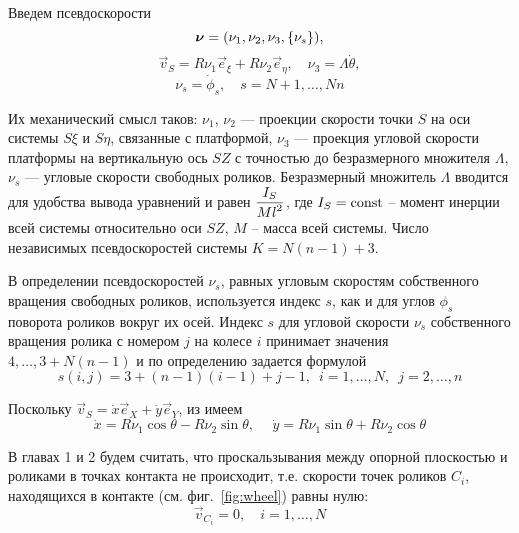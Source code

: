 Введем псевдоскорости
$$
    \boldsymbol{\mathbf{\nu}} = (\nu_1, \nu_2, \nu_3, \left\{\nu_s\right\}),
$$
\begin{equation}\label{eq:vsnu3}
    \vec{v}_S = R\nu_1\vec{e}_\xi + R\nu_2\vec{e}_\eta, \quad \nu_3 = \Lambda\dot{\theta},
\end{equation}
\begin{equation}\label{eq:nus}
    \nu_s = \dot{\phi}_s, \quad s = N + 1,\ldots,Nn
\end{equation}

Их механический смысл таков: $\nu_1$, $\nu_2$ --- проекции скорости точки $S$ на оси системы $S\xi$ и $S\eta$, связанные с платформой, $\nu_3$ --- проекция угловой скорости платформы на вертикальную ось $SZ$ с точностью до безразмерного множителя $\Lambda$, $\nu_s$ --- угловые скорости свободных роликов. Безразмерный множитель $\Lambda$ вводится для удобства вывода уравнений и равен $\displaystyle\frac{\displaystyle I_S}{\displaystyle M l^2}$, где $I_S = \mathrm{const}$ -- момент инерции всей системы относительно оси $SZ$, $M$ -- масса всей системы. Число независимых псевдоскоростей системы $K = N(n-1)+3$.

В определении псевдоскоростей $\nu_s$, равных угловым скоростям собственного вращения свободных роликов, используется индекс $s$, как и для углов $\phi_s$ поворота роликов вокруг их осей. Индекс $s$ для угловой скорости $\nu_s$ собственного вращения ролика с номером $j$ на колесе $i$ принимает значения $4,\ldots,3+N(n-1)$ и по определению задается формулой
\begin{equation}\label{eq:num}
    s(i, j) = 3 + (n-1)(i-1) + j - 1, \enspace i = 1,\ldots,N, \enspace j = 2,\ldots,n
\end{equation}

Поскольку $\vec{v}_S = \dot{x}\vec{e}_X + \dot{y}\vec{e}_Y$, из имеем
\begin{equation}\label{eq:constraints_xy}
    \dot{x} = R \nu_1\cos\theta-R\nu_2\sin\theta, \hspace{15pt} \dot{y} = R\nu_1\sin\theta+R\nu_2\cos\theta
\end{equation}

В главах 1 и 2 будем считать, что проскальзывания между опорной плоскостью и роликами в точках контакта не происходит, т.е. скорости точек роликов $C_i$, находящихся в контакте (см. фиг.~\ref{fig:wheel}) равны нулю:
\begin{equation}\label{eq:constraints_vec}
    \vec{v}_{C_i} = 0,\quad i = 1,\dots, N    
\end{equation}

